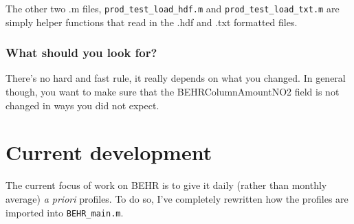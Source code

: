 \documentclass[12pt]{article}
\begin{document}
		The other two .m files, \lstinline$prod_test_load_hdf.m$ and \lstinline$prod_test_load_txt.m$ are simply helper functions that read in the .hdf and .txt formatted files.
		
		\subsubsection{What should you look for?}
		There's no hard and fast rule, it really depends on what you changed. In general though, you want to make sure that the BEHRColumnAmountNO2 field is not changed in ways you did not expect.

\section{Current development}
	The current focus of work on BEHR is to give it daily (rather than monthly average) \emph{a priori}  profiles. To do so, I've completely rewritten how the  profiles are imported into \lstinline$BEHR_main.m$.
\end{document}
